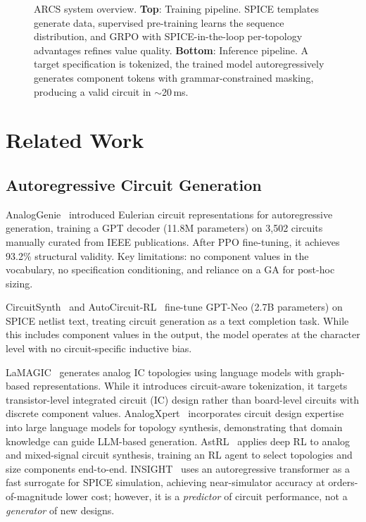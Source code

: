 \documentclass[conference]{IEEEtran}
\begin{document}
\begin{figure}[t]
\caption{ARCS system overview. \textbf{Top}: Training pipeline. SPICE
templates generate data, supervised pre-training learns the sequence
distribution, and GRPO with SPICE-in-the-loop per-topology advantages
refines value quality. \textbf{Bottom}: Inference pipeline. A target
specification is tokenized, the trained model autoregressively generates
component tokens with grammar-constrained masking, producing a valid
circuit in $\sim$20\,ms.}
\label{fig:overview}
\end{figure}

\section{Related Work}
\label{sec:related}

\subsection{Autoregressive Circuit Generation}

AnalogGenie~\cite{analoggenie} introduced Eulerian circuit representations
for autoregressive generation, training a GPT decoder (11.8M parameters)
on 3,502 circuits manually curated from IEEE publications.
After PPO fine-tuning, it achieves 93.2\% structural validity. Key
limitations: no component values in the vocabulary, no specification
conditioning, and reliance on a GA for post-hoc sizing.

CircuitSynth~\cite{circuitsynth} and AutoCircuit-RL~\cite{autocircuitrl}
fine-tune GPT-Neo (2.7B parameters) on SPICE netlist text, treating
circuit generation as a text completion task. While this includes
component values in the output, the model operates at the character
level with no circuit-specific inductive bias.

LaMAGIC~\cite{lamagic} generates analog IC topologies using language
models with graph-based representations. While it introduces
circuit-aware tokenization, it targets transistor-level integrated
circuit (IC) design rather than board-level circuits with discrete
component values.
AnalogXpert~\cite{analogxpert} incorporates circuit design expertise
into large language models for topology synthesis, demonstrating that
domain knowledge can guide LLM-based generation.
AstRL~\cite{astrl} applies deep RL to analog and
mixed-signal circuit synthesis, training an RL agent to select
topologies and size components end-to-end.
INSIGHT~\cite{insight} uses an autoregressive transformer as a
fast surrogate for SPICE simulation, achieving near-simulator
accuracy at orders-of-magnitude lower cost; however, it is a
\emph{predictor} of circuit performance, not a \emph{generator}
of new designs.
\end{document}
